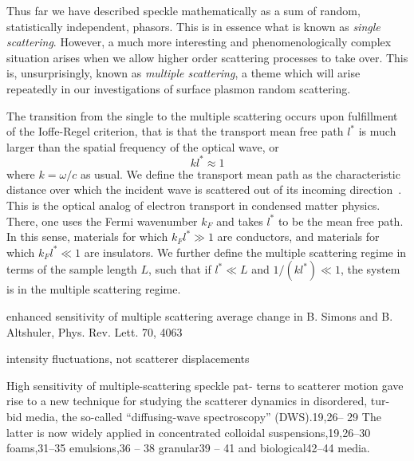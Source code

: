 Thus far we have described speckle mathematically as a sum of random,
statistically independent, phasors.  This is in essence what is known as
\textit{single scattering}.  However, a much more interesting and
phenomenologically complex situation arises when we allow higher order
scattering processes to take over.  This is, unsurprisingly, known as
\textit{multiple scattering}, a theme which will arise repeatedly in
our investigations of surface plasmon random scattering.  

The transition from the single to the multiple scattering occurs upon
fulfillment of the Ioffe-Regel criterion, that is that the transport mean free path
$l^*$ is much larger than the spatial frequency of the optical wave, or
\begin{equation}
k l^* \approx 1
\end{equation}
where $k=\omega/c$ as usual.  We define the transport mean path as the
characteristic distance over which the incident wave is scattered out of
its incoming direction~\cite{berkovits1994correlations}.  This is the
optical analog of electron transport in condensed matter physics.  There,
one uses the Fermi wavenumber $k_F$ and takes $l^*$ to be the mean free
path.  In this sense, materials for which $k_F l^* \gg 1$ are conductors, and materials
for which $k_F l^* \ll 1$ are insulators.  
We further define the multiple scattering regime in terms of the sample
length $L$, such that if $l^* \ll L$ and $1/(k l^*) \ll 1$, the system is in
the multiple scattering regime.  



enhanced sensitivity of multiple scattering
average change in B. Simons and B. Altshuler, Phys. Rev. Lett. 70, 4063

intensity fluctuations, not scatterer displacements

High sensitivity of multiple-scattering speckle pat-
terns to scatterer motion gave rise to a new technique
for studying the scatterer dynamics in disordered, tur-
bid media, the so-called “diffusing-wave spectroscopy”
(DWS).19,26– 29 The latter is now widely applied in
concentrated colloidal suspensions,19,26–30 foams,31–35
emulsions,36 – 38 granular39 – 41 and biological42–44 media.

